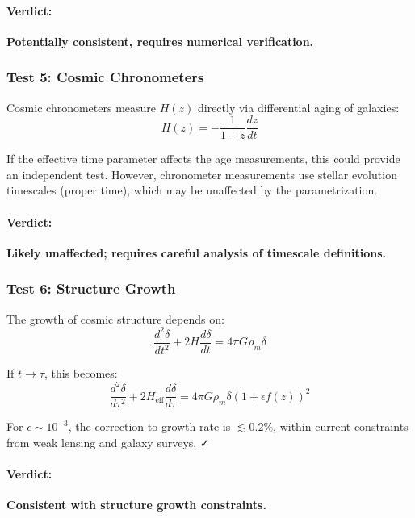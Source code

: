 \paragraph{Verdict:} \textbf{Potentially consistent, requires numerical verification.}

\subsubsection{Test 5: Cosmic Chronometers}

Cosmic chronometers measure $H(z)$ directly via differential aging of galaxies:
\begin{equation}
H(z) = -\frac{1}{1+z} \frac{dz}{dt}
\label{eq:cosmic_chronometers}
\end{equation}

If the effective time parameter affects the age measurements, this could provide an independent test. However, chronometer measurements use stellar evolution timescales (proper time), which may be unaffected by the parametrization.

\paragraph{Verdict:} \textbf{Likely unaffected; requires careful analysis of timescale definitions.}

\subsubsection{Test 6: Structure Growth}

The growth of cosmic structure depends on:
\begin{equation}
\frac{d^2\delta}{dt^2} + 2H \frac{d\delta}{dt} = 4\pi G \rho_m \delta
\label{eq:growth_equation}
\end{equation}

If $t \to \tau$, this becomes:
\begin{equation}
\frac{d^2\delta}{d\tau^2} + 2H_{\text{eff}} \frac{d\delta}{d\tau} = 4\pi G \rho_m \delta (1 + \epsilon f(z))^2
\label{eq:growth_eff}
\end{equation}

For $\epsilon \sim 10^{-3}$, the correction to growth rate is $\lesssim 0.2\%$, within current constraints from weak lensing and galaxy surveys. ✓

\paragraph{Verdict:} \textbf{Consistent with structure growth constraints.}

